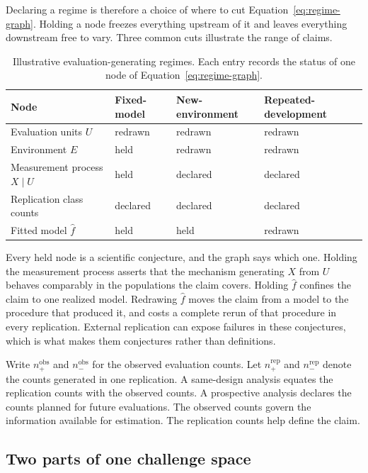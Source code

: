 \documentclass[11pt]{article}
\theoremstyle{remark}
\begin{document}
Declaring a regime is therefore a choice of where to cut Equation~\eqref{eq:regime-graph}. Holding a node freezes everything upstream of it and leaves everything downstream free to vary. Three common cuts illustrate the range of claims.

\begin{table}[ht]
\centering
\caption{Illustrative evaluation-generating regimes. Each entry records the status of one node of Equation~\eqref{eq:regime-graph}.}
\label{tab:regimes}
\begin{tabularx}{\textwidth}{@{}>{\raggedright\arraybackslash}p{}XXX@{}}
\toprule
Node & Fixed-model & New-environment & Repeated-development \\
\midrule
Evaluation units $U$ & redrawn & redrawn & redrawn \\
Environment $E$ & held & redrawn & redrawn \\
Measurement process $X\mid U$ & held & declared & declared \\
Replication class counts & declared & declared & declared \\
Fitted model $\widehat f$ & held & held & redrawn \\
\bottomrule
\end{tabularx}
\end{table}

Every held node is a scientific conjecture, and the graph says which one. Holding the measurement process asserts that the mechanism generating $X$ from $U$ behaves comparably in the populations the claim covers. Holding $\widehat f$ confines the claim to one realized model. Redrawing $\widehat f$ moves the claim from a model to the procedure that produced it, and costs a complete rerun of that procedure in every replication. External replication can expose failures in these conjectures, which is what makes them conjectures rather than definitions.

Write $n_+^{\mathrm{obs}}$ and $n_-^{\mathrm{obs}}$ for the observed evaluation counts. Let $n_+^{\mathrm{rep}}$ and $n_-^{\mathrm{rep}}$ denote the counts generated in one replication. A same-design analysis equates the replication counts with the observed counts. A prospective analysis declares the counts planned for future evaluations. The observed counts govern the information available for estimation. The replication counts help define the claim.

\subsection{Two parts of one challenge space}
\label{sec:challenge-space}
\end{document}
